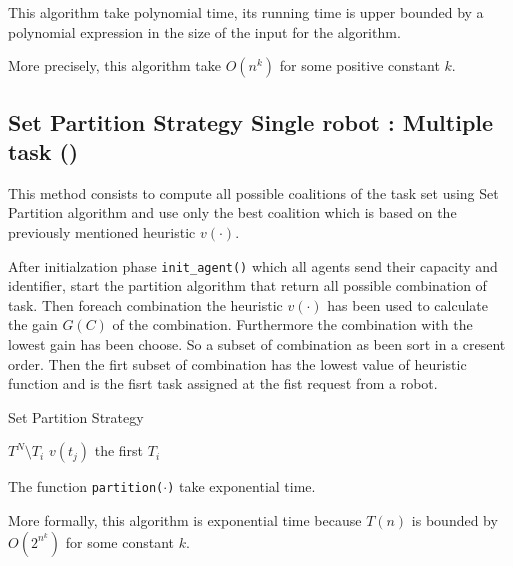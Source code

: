 This algorithm take polynomial time, its running time is upper bounded by a polynomial expression
in the size of the input for the algorithm.

More precisely, this algorithm take $O(n^k)$ for some positive constant $k$. 

\newpage

\subsection{Set Partition Strategy Single robot : Multiple task (\sps)}

This method consists to compute all possible coalitions of the task set 
using Set Partition algorithm \cite{partition} and use only 
the best coalition which is based on the previously mentioned heuristic $v(\cdot)$.

After initialzation phase \texttt{init\_agent()} which all agents send their capacity and identifier,
start the partition algorithm \cite{partition} that return all possible combination 
of task.
Then foreach combination the heuristic $v(\cdot)$ has been used to calculate the gain $G(C)$ of the 
combination. Furthermore the combination with the lowest gain has been choose.
So a subset of combination as been sort in a cresent order. 
Then the firt subset of combination has the lowest value of heuristic function and 
is the fisrt task assigned at the fist request from a robot.

\begin{algorithm}
  \caption{Set Partition Strategy} \label{SP}
  \begin{algorithmic}[1]
  \State {}
  $T^N \setminus T_i$
  \EndIf
      $v(t_j)$ 
    \EndFor
  \EndFor
   the first $T_i$
  \EndProcedure
  \end{algorithmic}
\end{algorithm}

The function \texttt{partition($\cdot$)} take exponential time. 

More formally, this algorithm is exponential time because $T(n)$ is bounded by $O(2^{n^{k}})$ 
for some constant $k$.

